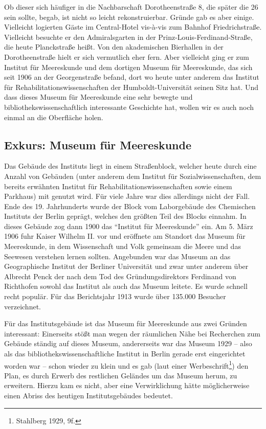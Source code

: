 \documentclass[a4paper,
fontsize=11pt,
oneside,
numbers=noperiodatend,
parskip=half-,
bibliography=totoc,
final
]{scrartcl}
\begin{document}
Ob dieser sich häufiger in die Nachbarschaft Dorotheenstraße 8, die
später die 26 sein sollte, begab, ist nicht so leicht rekonstruierbar.
Gründe gab es aber einige. Vielleicht logierten Gäste im Central-Hotel
vis-à-vis zum Bahnhof Friedrichstraße. Vielleicht besuchte er den
Admiralsgarten in der Prinz-Louis-Ferdinand-Straße, die heute
Planckstraße heißt. Von den akademischen Bierhallen in der
Dorotheenstraße hielt er sich vermutlich eher fern. Aber vielleicht ging
er zum Institut für Meereskunde und dem dortigen Museum für Meereskunde,
das sich seit 1906 an der Georgenstraße befand, dort wo heute unter
anderem das Institut für Rehabilitationswissenschaften der
Humboldt-Universität seinen Sitz hat. Und dass dieses Museum für
Meereskunde eine sehr bewegte und bibliothekswissenschaftlich
interessante Geschichte hat, wollen wir es auch noch einmal an die
Oberfläche holen.

\hypertarget{exkurs-museum-fuxfcr-meereskunde}{%
\subsection{Exkurs: Museum für
Meereskunde}\label{exkurs-museum-fuxfcr-meereskunde}}

Das Gebäude des Instituts liegt in einem Straßenblock, welcher heute
durch eine Anzahl von Gebäuden (unter anderem dem Institut für
Sozialwissenschaften, dem bereits erwähnten Institut für
Rehabilitationswissenschaften sowie einem Parkhaus) mit genutzt wird.
Für viele Jahre war dies allerdings nicht der Fall. Ende des 19.
Jahrhunderts wurde der Block vom Laborgebäude des Chemischen Instituts
der Berlin geprägt, welches den größten Teil des Blocks einnahm. In
dieses Gebäude zog dann 1900 das \enquote{Institut für Meereskunde} ein.
Am 5. März 1906 fuhr Kaiser Wilhelm II. vor und eröffnete am Standort
das Museum für Meereskunde, in dem Wissenschaft und Volk gemeinsam die
Meere und das Seewesen verstehen lernen sollten. Angebunden war das
Museum an das Geographische Institut der Berliner Universität und zwar
unter anderem über Albrecht Penck der nach dem Tod des
Gründungsdirektors Ferdinand von Richthofen sowohl das Institut als auch
das Museum leitete. Es wurde schnell recht populär. Für das Berichtsjahr
1913 wurde über 135.000 Besucher verzeichnet.

Für das Institutsgebäude ist das Museum für Meereskunde aus zwei Gründen
interessant: Einerseits stößt man wegen der räumlichen Nähe bei
Recherchen zum Gebäude ständig auf dieses Museum, andererseits war das
Museum 1929 -- also als das bibliothekswissenschaftliche Institut in
Berlin gerade erst eingerichtet worden war -- schon wieder zu klein und
es gab (laut einer Werbeschrift\footnote{Stahlberg 1929, 9f.}) den Plan,
es durch Erwerb des restlichen Geländes um das Museum herum, zu
erweitern. Hierzu kam es nicht, aber eine Verwirklichung hätte
möglicherweise einen Abriss des heutigen Institutsgebäudes bedeutet.
\end{document}
